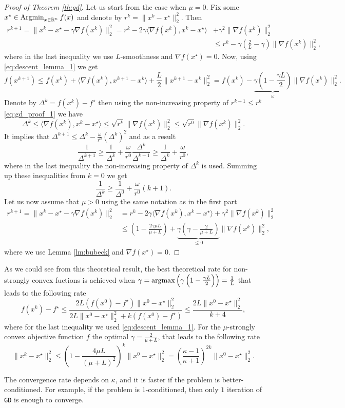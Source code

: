 \begin{proof}[Proof of Theorem \ref{th:gd}]
Let us start from the case when $\mu = 0$. Fix some $x^\star\in\operatorname*{Argmin}_{x\in\mathbb{R}^n} f(x)$ and denote by $r^k = \|x^k-x^\star\|^2_2$.
Then 
\begin{align}\label{eq:gd_proof_1}
r^{k+1} = \|x^k - x^\star - \gamma\nabla f(x^k)\|_2^2 = r^k - 2\gamma\langle \nabla f(x^k), x^k - x^\star\rangle &+ \gamma^2\|\nabla f(x^k)\|_2^2\nonumber\\
&\leq r^k - \gamma\left(\frac2L - \gamma\right)\|\nabla f(x^k)\|_2^2,
\end{align}
where in the last inequality we use $L$-smoothness and $\nabla f(x^\star) = 0$. Now, using \eqref{eq:descent_lemma_1} we get
$$
f(x^{k+1})\leq f(x^k) + \langle \nabla f(x^k), x^{k+1} - x^k\rangle + \frac{L}{2}\|x^{k+1}- x^k\|_2^2 = f(x^k) - \underbrace{\gamma\left(1 - \frac{\gamma L}{2}\right)}_{\omega}\|\nabla f(x^k)\|_2^2.
$$
Denote by $\Delta^k = f(x^k)-f^\star$ then using the non-increasing property of $r^{k+1}\leq r^k$ \eqref{eq:gd_proof_1} we have
$$
\Delta^k \leq\langle\nabla f(x^k), x^k-x^\star\rangle\leq \sqrt{r^k}\|\nabla f(x^k)\|_2^2\leq \sqrt{r^0}\|\nabla f(x^k)\|_2^2.
$$
It implies that $\Delta^{k+1}\leq\Delta^k - \frac{\omega}{r^0}(\Delta^k)^2$ and as a result
$$
\frac{1}{\Delta^{k+1}}\geq \frac{1}{\Delta^k} + \frac{\omega}{r^0}\frac{\Delta^k}{\Delta^{k+1}}\geq \frac{1}{\Delta^k} + \frac{\omega}{r^0},
$$
where in the last inequality the non-increasing property of $\Delta^k$ is used.
Summing up these inequalities from $k=0$ we get
$$
\frac{1}{\Delta^k}\geq \frac{1}{\Delta^0} + \frac{\omega}{r^0}(k+1).
$$
Let us now assume that $\mu> 0$ using the same notation as in the first part
\begin{align}
r^{k+1} = \|x^k - x^\star - \gamma \nabla f(x^k)\|_2^2 &= r^k - 2\gamma\langle \nabla f(x^k), x^k - x^\star\rangle + \gamma^2\|\nabla f(x^k)\|_2^2\nonumber\\
&\leq \left(1-\frac{2\gamma\mu L}{\mu + L}\right) + \underbrace{\gamma\left(\gamma - \frac{2}{\mu + L}\right)}_{\leq 0}\|\nabla f(x^k)\|_2^2,
\end{align}
where we use Lemma \ref{lm:bubeck} and $\nabla f(x^\star) = 0$.
\end{proof}
As we could see from this theoretical result, the best theoretical rate for non-strongly convex fuctions is achieved when $\gamma = \operatorname*{argmax}\left(\gamma\left(1 - \frac{\gamma L}{2}\right)\right) = \frac{1}{L}$ that leads to the following rate
\begin{equation}\label{eq:gd_rate}
    f(x^k) - f^\star \leq \frac{2L(f(x^0)-f^\star)\|x^0-x^\star\|_2^2}{2L\|x^0-x^\star\|_2^2 +k(f(x^0) - f^\star)}\leq \frac{2L\|x^0-x^\star\|^2_2}{k+4},
\end{equation}
where for the last inequality we used \eqref{eq:descent_lemma_1}.
For the $\mu$-strongly convex objective function $f$ the optimal $\gamma= \frac{2}{\mu + L}$, that leads to the following rate
\begin{equation}\label{eq:gd_rate_strongly}
\|x^k-x^\star\|_2^2\leq\left(1-\frac{4\mu L}{(\mu + L)^2}\right)^k\|x^0-x^\star\|_2^2 = \left(\frac{\kappa - 1}{\kappa + 1}\right)^{2k}\|x^0-x^\star\|_2^2.
\end{equation}

{The convergence rate depends on $\kappa$, and it is faster if the problem is better-conditioned. For example, if the problem is $1$-conditioned, then only $1$ iteration of \texttt{GD} is enough to converge.}